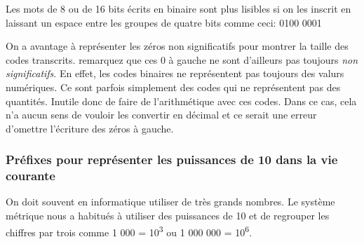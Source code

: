 \documentclass[
  letterpaper,
]{scrbook}
\theoremstyle{definition}
\theoremstyle{definition}
\theoremstyle{remark}
\begin{document}
\begin{tcolorbox}[enhanced jigsaw, arc=.35mm, breakable, rightrule=.15mm, left=2mm, colbacktitle=quarto-callout-tip-color!10!white, colframe=quarto-callout-tip-color-frame, coltitle=black, titlerule=0mm, leftrule=.75mm, toprule=.15mm, bottomtitle=1mm, opacityback=0, title=\textcolor{quarto-callout-tip-color}{\faLightbulb}\hspace{0.5em}{Truc}, toptitle=1mm, bottomrule=.15mm, opacitybacktitle=0.6, colback=white]

Les mots de 8 ou de 16 bits écrits en binaire sont plus lisibles si on
les inscrit en laissant un espace entre les groupes de quatre bits comme
ceci: 0100 0001

\end{tcolorbox}

\begin{tcolorbox}[enhanced jigsaw, arc=.35mm, breakable, rightrule=.15mm, left=2mm, colbacktitle=quarto-callout-tip-color!10!white, colframe=quarto-callout-tip-color-frame, coltitle=black, titlerule=0mm, leftrule=.75mm, toprule=.15mm, bottomtitle=1mm, opacityback=0, title=\textcolor{quarto-callout-tip-color}{\faLightbulb}\hspace{0.5em}{Truc}, toptitle=1mm, bottomrule=.15mm, opacitybacktitle=0.6, colback=white]

On a avantage à représenter les zéros non significatifs pour montrer la
taille des codes transcrits. remarquez que ces 0 à gauche ne sont
d'ailleurs pas toujours \emph{non significatifs}. En effet, les codes
binaires ne représentent pas toujours des valurs numériques. Ce sont
parfois simplement des codes qui ne représentent pas des quantités.
Inutile donc de faire de l'arithmétique avec ces codes. Dans ce cas,
cela n'a aucun sens de vouloir les convertir en décimal et ce serait une
erreur d'omettre l'écriture des zéros à gauche.

\end{tcolorbox}

\hypertarget{pruxe9fixes-pour-repruxe9senter-les-puissances-de-10-dans-la-vie-courante}{%
\subsubsection{Préfixes pour représenter les puissances de 10 dans la
vie
courante}\label{pruxe9fixes-pour-repruxe9senter-les-puissances-de-10-dans-la-vie-courante}}

On doit souvent en informatique utiliser de très grands nombres. Le
système métrique nous a habitués à utiliser des puissances de 10 et de
regrouper les chiffres par trois comme 1 000 = 10\textsuperscript{3} ou
1 000 000 = 10\textsuperscript{6}.
\end{document}
